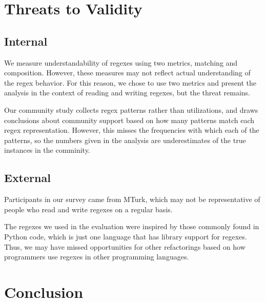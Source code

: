 \section{Threats to Validity}

\subsection{Internal}
We measure understandability of regexes using two metrics, matching and composition. However, these measures may not reflect actual understanding of the regex behavior. For this reason, we chose to use two metrics and present the analysis in the context of reading and writing regexes, but the threat remains. 

Our community study collects regex patterns rather than utilizations, and draws conclusions about community support based on how many patterns match each regex representation. However, this misses the frequencies with which each of the patterns, so the numbers given in the analysis are underestimates of the true instances in the comminity. 


\subsection{External}
Participants in our survey came from MTurk, which may not be representative of people who read and write regexes on a regular basis. 

The regexes we used in the evaluation were inspired by those commonly found in Python code, which is just one language that has library support for regexes. Thus, we may have missed opportunities for other refactorings based on how programmers use regexes in other programming languages. 

\section{Conclusion}
